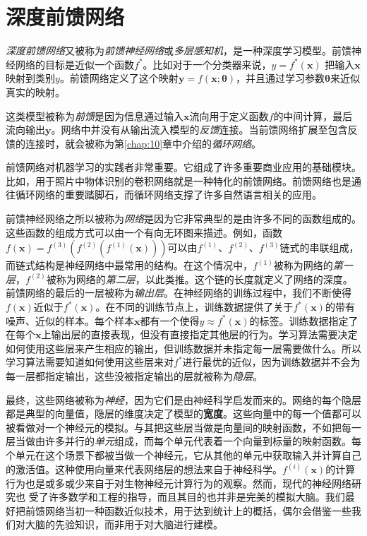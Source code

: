 \chapter{深度前馈网络}
\label{chap:6}

\emph{深度前馈网络}又被称为\emph{前馈神经网络}或\emph{多层感知机}，是一种深度学习模型。前馈神经网络的目标是近似一个函数$f^*$。比如对于一个分类器来说，$y=f^*(\textbf{x})$ 把输入$\textbf{x}$映射到类别$y$。前馈网络定义了这个映射$\textbf{y}=f(\textbf{x};\bm{\theta})$，并且通过学习参数$\bm{\theta}$来近似真实的映射。


这类模型被称为\emph{前馈}是因为信息通过输入$\textbf{x}$流向用于定义函数$f$的中间计算，最后流向输出$\textbf{y}$。网络中并没有从输出流入模型的\emph{反馈}连接。当前馈网络扩展至包含反馈的连接时，就会被称为第\ref{chap:10}章中介绍的\emph{循环网络}。


前馈网络对机器学习的实践者非常重要。它组成了许多重要商业应用的基础模块。比如，用于照片中物体识别的卷积网络就是一种特化的前馈网络。前馈网络也是通往循环网络的重要踏脚石，而循环网络支撑了许多自然语言相关的应用。


前馈神经网络之所以被称为\emph{网络}是因为它非常典型的是由许多不同的函数组成的。这些函数的组成方式可以由一个有向无环图来描述。例如，函数$f(\textbf{x})=f^{(3)}(f^{(2)}(f^{(1)}(\textbf{x})))$可以由$f^{(1)}$、$f^{(2)}$、$f^{(3)}$链式的串联组成，而链式结构是神经网络中最常用的结构。在这个情况中，$f^{(1)}$被称为网络的\emph{第一层}，$f^{(2)}$被称为网络的\emph{第二层}，以此类推。这个链的长度就定义了网络的深度。前馈网络的最后的一层被称为\emph{输出层}。在神经网络的训练过程中，我们不断使得$f(\textbf{x})$近似于$f^*(\textbf{x})$。在不同的训练节点上，训练数据提供了关于$f^*(\bm{x})$的带有噪声、近似的样本。每个样本$\bm{x}$都有一个使得$y \approx f^*(\bm{x})$的标签。训练数据指定了在每个$\bm{x}$上输出层的直接表现，但没有直接指定其他层的行为。学习算法需要决定如何使用这些层来产生相应的输出，但训练数据并未指定每一层需要做什么。所以学习算法需要知道如何使用这些层来对$f^*$进行最优的近似，因为训练数据并不会为每一层都指定输出，这些没被指定输出的层就被称为\emph{隐层}。


最终，这些网络被称为\emph{神经}，因为它们是由神经科学启发而来的。网络的每个隐层都是典型的向量值，隐层的维度决定了模型的\textbf{宽度}。这些向量中的每一个值都可以被看做对一个神经元的模拟。与其把这些层当做是向量间的映射函数，不如把每一层当做由许多并行的\emph{单元}组成，而每个单元代表着一个向量到标量的映射函数。每个单元在这个场景下都被当做一个神经元，它从其他的单元中获取输入并计算自己的激活值。这种使用向量来代表网络层的想法来自于神经科学。$f^{(i)}(\bm{x})$的计算行为也是或多或少来自于对生物神经元计算行为的观察。然而，现代的神经网络研究也
受了许多数学和工程的指导，而且其目的也并非是完美的模拟大脑。我们最好把前馈网络当初一种函数近似技术，用于达到统计上的概括，偶尔会借鉴一些我们对大脑的先验知识，而非用于对大脑进行建模。



